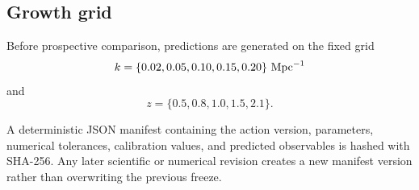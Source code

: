 \subsection{Growth grid}

Before prospective comparison, predictions are generated on the fixed grid
\[
k=\{0.02,0.05,0.10,0.15,0.20\}\ {\rm Mpc}^{-1}
\]
and
\[
z=\{0.5,0.8,1.0,1.5,2.1\}.
\]

A deterministic JSON manifest containing the action version, parameters, numerical tolerances, calibration values, and predicted observables is hashed with SHA-256. Any later scientific or numerical revision creates a new manifest version rather than overwriting the previous freeze.
